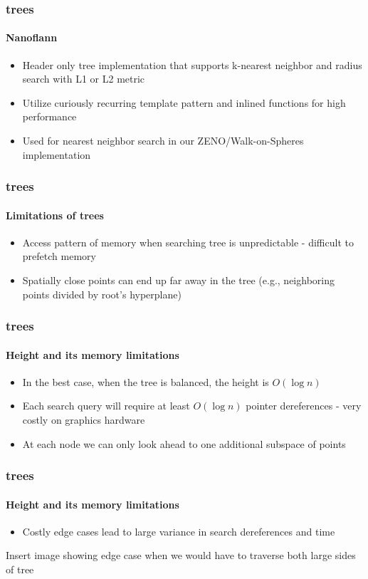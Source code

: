 \begin{frame}
  \frametitle{\kd trees}
  \framesubtitle{Nanoflann}

  \begin{itemize}
    \item Header only \kd tree implementation that supports k-nearest neighbor and radius search with 
      L1 or L2 metric
    \item Utilize curiously recurring template pattern and inlined functions for high performance
    \item Used for nearest neighbor search in our ZENO/Walk-on-Spheres implementation 
  \end{itemize}

\end{frame}


\begin{frame}
  \frametitle{\kd trees}
  \framesubtitle{Limitations of trees}

  \begin{itemize}
    \item Access pattern of memory when searching tree is unpredictable - difficult to prefetch memory
    \item Spatially close points can end up far away in the tree (e.g., neighboring points divided by 
      root's hyperplane)
  \end{itemize}
\end{frame}

\begin{frame}
  \frametitle{\kd trees}
  \framesubtitle{Height and its memory limitations}

  \begin{itemize}
    \item In the best case, when the tree is balanced, the height is $O(\log n)$
    \item Each search query will require at least $O(\log n )$ pointer dereferences - very costly on graphics 
      hardware
    \item At each node we can only look ahead to one additional subspace of points
  \end{itemize}
\end{frame}

\begin{frame}
  \frametitle{\kd trees}
  \framesubtitle{Height and its memory limitations}

  \begin{itemize}
    \item Costly edge cases lead to large variance in search dereferences and time
  \end{itemize}

  Insert image showing edge case when we would have to traverse both large sides of tree
\end{frame}
